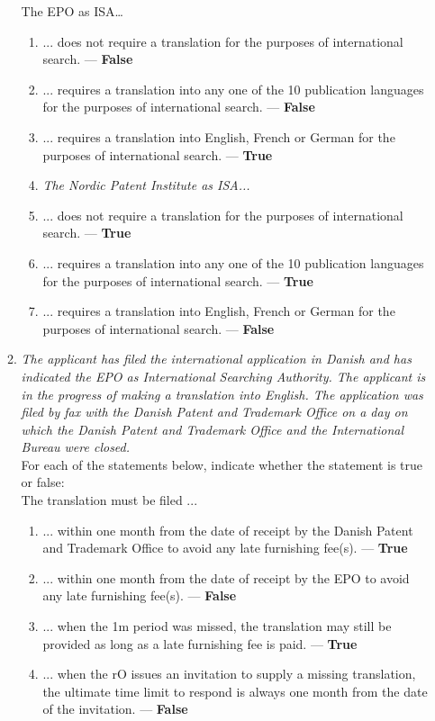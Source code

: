 \documentclass{report}
\begin{document}
\begin{enumerate}[label=\textbf{Answer \arabic*}]
\begin{enumerate}[label=(\alph*)]
        \vspace{0.5em}
        The EPO as ISA…
        \begin{enumerate}[label={(\alph{enumi}.\arabic*)}]
            \item ... does not require a translation for the purposes of international search. --- \textbf{False}
            \item ... requires a translation into any one of the 10 publication languages for the purposes of international search. --- \textbf{False}
            \item ... requires a translation into English, French or German for the purposes of international search. --- \textbf{True}
            \item[] \textit{The Nordic Patent Institute as ISA...}
            \item ... does not require a translation for the purposes of international search. --- \textbf{True}
            \item ... requires a translation into any one of the 10 publication languages for the purposes of international search. --- \textbf{True}
            \item ... requires a translation into English, French or German for the purposes of international search. --- \textbf{False}
        \end{enumerate}

        \item \textit{The applicant has filed the international application in Danish and has indicated the EPO as International Searching Authority. The applicant is in the progress of making a translation into English. The application was filed by fax with the Danish Patent and Trademark Office on a day on which the Danish Patent and Trademark Office and the International Bureau were closed.} \\
        For each of the statements below, indicate whether the statement is true or false: \\
        The translation must be filed ...
        \begin{enumerate}[label={(\alph{enumi}.\arabic*)}]
            \item ... within one month from the date of receipt by the Danish Patent and Trademark Office to avoid any late furnishing fee(s). --- \textbf{True}
            \item ... within one month from the date of receipt by the EPO to avoid any late furnishing fee(s). --- \textbf{False}
            \item ... when the 1m period was missed, the translation may still be provided as long as a late furnishing fee is paid.
            --- \textbf{True}
            \item ... when the rO issues an invitation to supply a missing translation, the ultimate time limit to respond is always one month from the date of the invitation. --- \textbf{False}
        \end{enumerate}
        

\end{enumerate}
\end{enumerate}
\end{document}
